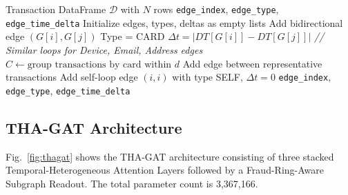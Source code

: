 \documentclass[journal]{IEEEtran}
\begin{document}
\begin{algorithm}[!t]
\caption{Heterogeneous Graph Construction}
\label{alg:graph}
\begin{algorithmic}[1]
\REQUIRE Transaction DataFrame $\mathcal{D}$ with $N$ rows
\ENSURE \texttt{edge\_index}, \texttt{edge\_type}, \texttt{edge\_time\_delta}
\STATE Initialize edges, types, deltas as empty lists
                \STATE Add bidirectional edge $(G[i], G[j])$ 
                \STATE Type = CARD
                \STATE $\Delta t = |DT[G[i]] - DT[G[j]]|$
            \ENDFOR
        \ENDFOR
    \ENDIF
\ENDFOR
\STATE \emph{// Similar loops for Device, Email, Address edges}
    \STATE $C \gets \text{group transactions by card within } d$
            \STATE Add edge between representative transactions
        \ENDFOR
    \ENDIF
\ENDFOR
{}
    \STATE Add self-loop edge $(i, i)$ with type SELF, $\Delta t = 0$
\ENDFOR
\RETURN \texttt{edge\_index}, \texttt{edge\_type}, \texttt{edge\_time\_delta}
\end{algorithmic}
\end{algorithm}

\subsection{THA-GAT Architecture}
\label{sec:thagat}

Fig.~\ref{fig:thagat} shows the THA-GAT architecture consisting of three stacked Temporal-Heterogeneous Attention Layers followed by a Fraud-Ring-Aware Subgraph Readout. The total parameter count is 3,367,166.
\end{document}
